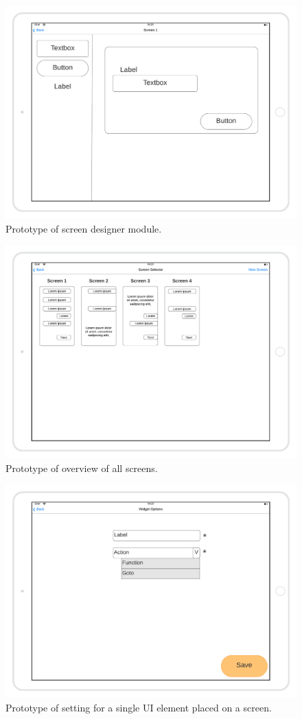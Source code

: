 \begin{figure}[H]
    \includegraphics[width=\textwidth]{images/Design-a-screen-mockup.png}
    \caption{Prototype of screen designer module.}
\end{figure}

\begin{figure}[H]
    \includegraphics[width=\textwidth]{images/screens-mockup.png}
    \caption{Prototype of overview of all screens.}
\end{figure}

\begin{figure}[H]
    \includegraphics[width=\textwidth]{images/ui-element-settings-mockup.png}
    \caption{Prototype of setting for a single UI element placed on a screen.}
\end{figure}
